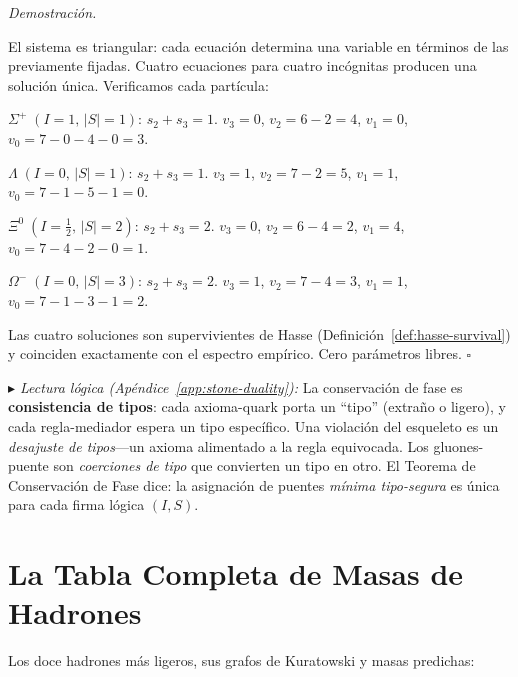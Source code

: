\documentclass[11pt, a4paper, openany]{book}
\newcommand{\stoneref}[1]{%
  \smallskip\noindent
  {\small\color{structure!70}\textit{$\blacktriangleright$ Lectura
  l\'ogica (Ap\'endice~\ref{app:stone-duality}):} #1}%
  \smallskip}
\renewenvironment{proof}[1][Demostraci\'on]{%
  \par\noindent\textit{#1.}\quad
}{\hfill$\square$\par\medskip}
\begin{document}
\begin{proof}
El sistema es triangular: cada ecuaci\'on determina una variable en
t\'erminos de las previamente fijadas.  Cuatro ecuaciones para cuatro
inc\'ognitas producen una soluci\'on \'unica.  Verificamos cada
part\'icula:

\smallskip\noindent
$\Sigma^+\;(I{=}1,\, |S|{=}1)$:
$s_2{+}s_3 = 1$.
$v_3 = 0$, $v_2 = 6 - 2 = 4$, $v_1 = 0$,
$v_0 = 7 - 0 - 4 - 0 = 3$.

\smallskip\noindent
$\Lambda\;(I{=}0,\, |S|{=}1)$:
$s_2{+}s_3 = 1$.
$v_3 = 1$, $v_2 = 7 - 2 = 5$, $v_1 = 1$,
$v_0 = 7 - 1 - 5 - 1 = 0$.

\smallskip\noindent
$\Xi^0\;(I{=}\tfrac{1}{2},\, |S|{=}2)$:
$s_2{+}s_3 = 2$.
$v_3 = 0$, $v_2 = 6 - 4 = 2$, $v_1 = 4$,
$v_0 = 7 - 4 - 2 - 0 = 1$.

\smallskip\noindent
$\Omega^-\;(I{=}0,\, |S|{=}3)$:
$s_2{+}s_3 = 2$.
$v_3 = 1$, $v_2 = 7 - 4 = 3$, $v_1 = 1$,
$v_0 = 7 - 1 - 3 - 1 = 2$.

\smallskip\noindent
Las cuatro soluciones son supervivientes de Hasse
(Definici\'on~\ref{def:hasse-survival}) y coinciden exactamente con
el espectro emp\'irico.  Cero par\'ametros libres.
\end{proof}

\stoneref{La conservaci\'on de fase es \textbf{consistencia de
tipos}: cada axioma-quark porta un ``tipo'' (extra\~no o ligero),
y cada regla-mediador espera un tipo espec\'ifico.  Una violaci\'on
del esqueleto es un \emph{desajuste de tipos}---un axioma alimentado
a la regla equivocada.  Los gluones-puente son \emph{coerciones de
tipo} que convierten un tipo en otro.  El Teorema de Conservaci\'on
de Fase dice: la asignaci\'on de puentes \emph{m\'inima
tipo-segura} es \'unica para cada firma l\'ogica $(I, S)$.}

\section{La Tabla Completa de Masas de Hadrones}
\label{sec:hadron-mass-table}

Los doce hadrones m\'as ligeros, sus grafos de Kuratowski y masas
predichas:
\end{document}
